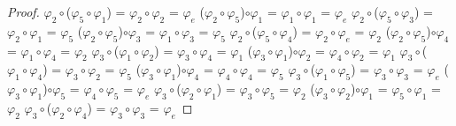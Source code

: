 \documentclass[10pt,a4paper,oneside]{article}
\begin{document}
\begin{proof}
				$\varphi_{2}\circ$($\varphi_{5}\circ\varphi_{1}$) = $\varphi_{2}\circ\varphi_{2}$ = $\varphi_{e}$
				\newline
				($\varphi_{2}\circ\varphi_{5}$)$\circ\varphi_{1}$ = $\varphi_{1}\circ\varphi_{1}$ = $\varphi_{e}$
				\newline
				\newline
				$\varphi_{2}\circ$($\varphi_{5}\circ\varphi_{3}$) = $\varphi_{2}\circ\varphi_{1}$ = $\varphi_{5}$
				\newline
				($\varphi_{2}\circ\varphi_{5}$)$\circ\varphi_{3}$ = $\varphi_{1}\circ\varphi_{3}$ = $\varphi_{5}$
				\newline
				\newline
				$\varphi_{2}\circ$($\varphi_{5}\circ\varphi_{4}$) = $\varphi_{2}\circ\varphi_{e}$ = $\varphi_{2}$
				\newline
				($\varphi_{2}\circ\varphi_{5}$)$\circ\varphi_{4}$ = $\varphi_{1}\circ\varphi_{4}$ = $\varphi_{2}$
				\newline
				\newline
				$\varphi_{3}\circ$($\varphi_{1}\circ\varphi_{2}$) = $\varphi_{3}\circ\varphi_{4}$ = $\varphi_{1}$
				\newline
				($\varphi_{3}\circ\varphi_{1}$)$\circ\varphi_{2}$ = $\varphi_{4}\circ\varphi_{2}$ = $\varphi_{1}$
				\newline
				\newline
				$\varphi_{3}\circ$($\varphi_{1}\circ\varphi_{4}$) = $\varphi_{3}\circ\varphi_{2}$ = $\varphi_{5}$
				\newline
				($\varphi_{3}\circ\varphi_{1}$)$\circ\varphi_{4}$ = $\varphi_{4}\circ\varphi_{4}$ = $\varphi_{5}$
				\newline
				\newline
				$\varphi_{3}\circ$($\varphi_{1}\circ\varphi_{5}$) = $\varphi_{3}\circ\varphi_{3}$ = $\varphi_{e}$
				\newline
				($\varphi_{3}\circ\varphi_{1}$)$\circ\varphi_{5}$ = $\varphi_{4}\circ\varphi_{5}$ = $\varphi_{e}$
				\newline
				\newline
				$\varphi_{3}\circ$($\varphi_{2}\circ\varphi_{1}$) = $\varphi_{3}\circ\varphi_{5}$ = $\varphi_{2}$
				\newline
				($\varphi_{3}\circ\varphi_{2}$)$\circ\varphi_{1}$ = $\varphi_{5}\circ\varphi_{1}$ = $\varphi_{2}$
				\newline
				\newline
				$\varphi_{3}\circ$($\varphi_{2}\circ\varphi_{4}$) = $\varphi_{3}\circ\varphi_{3}$ = $\varphi_{e}$

\end{proof}
\end{document}
